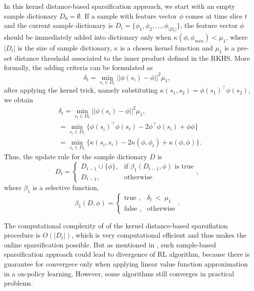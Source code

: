\documentclass[conference]{IEEEtran}
\begin{document}
In this kernel distance-based sparsification approach, we start with an empty sample dictionary $D_0 = \emptyset$. If a sample with feature vector $\phi$ comes at time slice $t$ and the current sample dictionary is $D_t = \{\phi_1, \phi_2,..., \phi_{|D_t|}\}$, the feature vector $\phi$ should be immediately added into dictionary only when $\kappa(\phi, \phi_{min}) < \mu_1$, where $|D_t|$ is the size of sample dictionary, $\kappa$ is a chosen kernel function and $\mu_1$ is a pre-set distance threshold associated to the inner product defined in the RKHS. More formally, the adding criteria can be formulated as
\begin{equation}
  \delta_t = \min_{s_i\in D_t}||\phi(s_i)-\phi||^2 \mu_1,
\end{equation}
after applying the kernel trick, namely substituting $\kappa(s_1, s_2)=\phi(s_1)^\top\phi(s_2)$, we obtain
\begin{equation}
  \begin{split}
    &\delta_t = \min_{s_i\in D_t}||\phi(s_i)-\phi||^2 \mu_1,\\
    &=\min_{s_i\in D_t}\{\phi(s_i)^\top\phi(s_t) - 2\phi^\top\phi(s_i)+\phi\phi\}\\
    &=\min_{s_i\in D_t}\{\kappa(s_i, s_i)-2\kappa(\phi, \phi_t)+\kappa(\phi, \phi)\}.
  \end{split}
\end{equation}
Thus, the update rule for the sample dictionary $D$ is
\begin{equation}
  D_t =
      \begin{cases}
          D_{t-1}\cup \{\phi\}, & \text{if } \beta_1(D_{t-1},\phi)\text{ is true}\\
          D_{t-1},& \text{otherwise}
      \end{cases},
\end{equation}
where $\beta_1$ is a selective function, 
\begin{equation}
  \beta_1(D, \phi) =
      \begin{cases}
			\text{true },& \delta_t\ <\ \mu_1\\
           	\text{false }, & \text{otherwise}
      \end{cases}.
\end{equation}

The computational complexity of of the kernel distance-based sparsifiation procedure is $O(|D_t|)$, which is very computational efficient and thus makes the online sparsification possible. But as mentioned in \cite{tsitsiklis1997analysis}\cite{sutton2009convergent}, such sample-based sparsification approach could lead to divergence of RL algorithm, because there is guarantee for convergece only when applying linear value function approximation in a on-policy learning. However, some algorithms still converges in practical problems.
\end{document}
